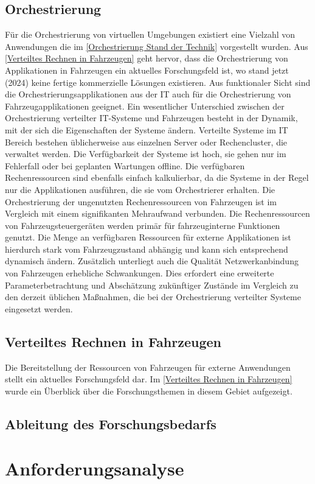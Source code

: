 \subsection{Orchestrierung}
Für die Orchestrierung von virtuellen Umgebungen existiert eine Vielzahl von Anwendungen die im \autoref{Orchestrierung Stand der Technik} vorgestellt wurden. Aus \autoref{Verteiltes Rechnen in Fahrzeugen} geht hervor, dass die Orchestrierung von Applikationen in Fahrzeugen ein aktuelles Forschungsfeld ist, wo stand jetzt (2024) keine fertige kommerzielle Lösungen existieren. Aus funktionaler Sicht sind die Orchestrierungsapplikationen aus der IT auch für die Orchestrierung von Fahrzeugapplikationen geeignet. Ein wesentlicher Unterschied zwischen der Orchestrierung verteilter IT-Systeme und Fahrzeugen besteht in der Dynamik, mit der sich die Eigenschaften der Systeme ändern. Verteilte Systeme im IT Bereich bestehen üblicherweise aus einzelnen Server oder Rechencluster, die verwaltet werden. Die Verfügbarkeit der Systeme ist hoch, sie gehen nur im Fehlerfall oder bei geplanten Wartungen offline. Die verfügbaren Rechenressourcen sind ebenfalls einfach kalkulierbar, da die Systeme in der Regel nur die Applikationen ausführen, die sie vom Orchestrierer erhalten. Die Orchestrierung der ungenutzten Rechenressourcen von Fahrzeugen ist im Vergleich mit einem signifikanten Mehraufwand verbunden. Die Rechenressourcen von Fahrzeugsteuergeräten werden primär für fahrzeuginterne Funktionen genutzt. Die Menge an verfügbaren Ressourcen für externe Applikationen ist hierdurch stark vom Fahrzeugzustand abhängig und kann sich entsprechend dynamisch ändern. Zusätzlich unterliegt auch die Qualität Netzwerkanbindung von Fahrzeugen erhebliche Schwankungen. Dies erfordert eine erweiterte Parameterbetrachtung und Abschätzung zukünftiger Zustände im Vergleich zu den derzeit üblichen Maßnahmen, die bei der Orchestrierung verteilter Systeme eingesetzt werden.
 
\subsection{Verteiltes Rechnen in Fahrzeugen}

Die Bereitstellung der Ressourcen von Fahrzeugen für externe Anwendungen stellt ein aktuelles Forschungsfeld dar. Im \autoref{Verteiltes Rechnen in Fahrzeugen} wurde ein Überblick über die Forschungsthemen in diesem Gebiet aufgezeigt. 

\subsection{Ableitung des Forschungsbedarfs}

\section{Anforderungsanalyse}


